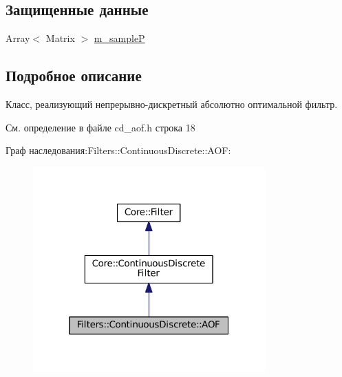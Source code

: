 \subsection*{Защищенные данные}
\begin{DoxyCompactItemize}
\item 
Array$<$ Matrix $>$ \hyperlink{class_filters_1_1_continuous_discrete_1_1_a_o_f_a31111852e94dab62675d8692a4c22df1}{m\+\_\+sampleP}
\end{DoxyCompactItemize}


\subsection{Подробное описание}
Класс, реализующий непрерывно-\/дискретный абсолютно оптимальной фильтр. 

См. определение в файле cd\+\_\+aof.\+h строка 18



Граф наследования\+:Filters\+:\+:Continuous\+Discrete\+:\+:A\+OF\+:
\nopagebreak
\begin{figure}[H]
\begin{center}
\leavevmode
\includegraphics[width=253pt]{class_filters_1_1_continuous_discrete_1_1_a_o_f__inherit__graph}
\end{center}
\end{figure}


